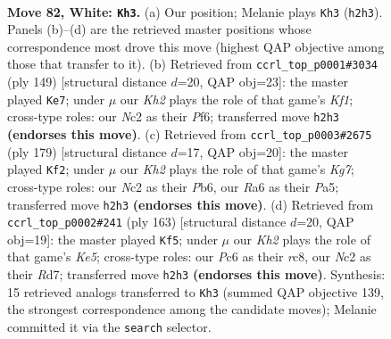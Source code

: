 \documentclass[11pt]{article}
\begin{document}
\clearpage

\begin{figure}[p]\centering
\begin{subfigure}{0.46\textwidth}\centering
\resizebox{\linewidth}{!}{%
\newchessgame
\chessboard[
  setfen={7k/5rb1/R1P5/6R1/8/8/2N4K/8 w - - 3 82},
  showmover=false,
  pgfstyle=straightmove, color=movearrow, markmove={h2-h3}
]}
\caption{}
\end{subfigure}\hfill
\begin{subfigure}{0.46\textwidth}\centering
\resizebox{\linewidth}{!}{%
\newchessgame
\chessboard[
  setfen={5k2/8/2r1Bp2/5K2/3R4/8/8/8 b - - 3 75},
  showmover=false,
  pgfstyle=straightmove, color=movearrow, markmove={f8-e7}
]}
\caption{}
\end{subfigure}
\\[4pt]
\begin{subfigure}{0.46\textwidth}\centering
\resizebox{\linewidth}{!}{%
\newchessgame
\chessboard[
  setfen={8/8/1p6/p7/3p1K2/1r1B4/6k1/3R4 b - - 17 90},
  showmover=false,
  pgfstyle=straightmove, color=movearrow, markmove={g2-f2}
]}
\caption{}
\end{subfigure}\hfill
\begin{subfigure}{0.46\textwidth}\centering
\resizebox{\linewidth}{!}{%
\newchessgame
\chessboard[
  setfen={2R5/3r4/4n3/4p1B1/4k2P/8/2K5/8 b - - 11 82},
  showmover=false,
  pgfstyle=straightmove, color=movearrow, markmove={e4-f5}
]}
\caption{}
\end{subfigure}
\caption{\textbf{Move 82, White: \texttt{Kh3}.} (a) Our position; Melanie plays \texttt{Kh3} (\texttt{h2h3}). Panels (b)--(d) are the retrieved master positions whose correspondence most drove this move (highest QAP objective among those that transfer to it). (b) Retrieved from \texttt{ccrl\_top\_p0001\#3034} (ply 149) [structural distance $d$=20, QAP obj=23]: the master played \texttt{Ke7}; under $\mu$ our \emph{Kh2} plays the role of that game's \emph{Kf1}; cross-type roles: our \emph{N}c2 as their \emph{P}f6; transferred move \texttt{h2h3} \textbf{(endorses this move)}. (c) Retrieved from \texttt{ccrl\_top\_p0003\#2675} (ply 179) [structural distance $d$=17, QAP obj=20]: the master played \texttt{Kf2}; under $\mu$ our \emph{Kh2} plays the role of that game's \emph{Kg7}; cross-type roles: our \emph{N}c2 as their \emph{P}b6, our \emph{R}a6 as their \emph{P}a5; transferred move \texttt{h2h3} \textbf{(endorses this move)}. (d) Retrieved from \texttt{ccrl\_top\_p0002\#241} (ply 163) [structural distance $d$=20, QAP obj=19]: the master played \texttt{Kf5}; under $\mu$ our \emph{Kh2} plays the role of that game's \emph{Ke5}; cross-type roles: our \emph{P}c6 as their \emph{r}c8, our \emph{N}c2 as their \emph{R}d7; transferred move \texttt{h2h3} \textbf{(endorses this move)}. Synthesis: 15 retrieved analogs transferred to \texttt{Kh3} (summed QAP objective 139, the strongest correspondence among the candidate moves); Melanie committed it via the \texttt{search} selector.}
\label{fig:thought-m162}
\end{figure}
\end{document}
